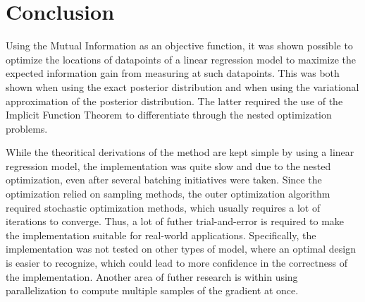 \section{Conclusion}
Using the Mutual Information as an objective function, it was shown possible to optimize 
the locations of datapoints of a linear regression model to maximize the expected information gain from measuring at such datapoints.
This was both shown when using the exact posterior distribution and when using the variational approximation of the posterior distribution.
The latter required the use of the Implicit Function Theorem to differentiate through the nested optimization problems.

While the theoritical derivations of the method are kept simple by using a linear regression model, the implementation was quite slow
and due to the nested optimization, even after several batching initiatives were taken.
Since the optimization relied on sampling methods, the outer optimization algorithm required stochastic optimization methods,
which usually requires a lot of iterations to converge. Thus, a lot of futher trial-and-error is required to make the implementation suitable for real-world applications.
Specifically, the implementation was not tested on other types of model, where an optimal design is easier to recognize, which could lead to more confidence in the correctness of the implementation.
Another area of futher research is within using parallelization to compute multiple samples of the gradient at once.
